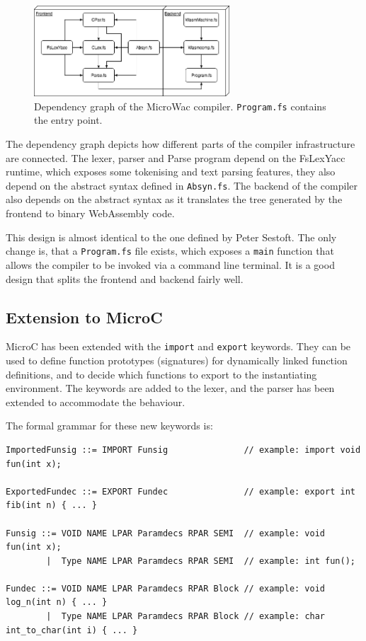 \documentclass[a4paper]{article}
\begin{document}
\begin{figure}[H]
	\includegraphics[width=0.65\textwidth]{DependencyGraph}
	\centering
	\caption{Dependency graph of the MicroWac compiler. \texttt{Program.fs} contains the entry point.}
\end{figure}

The dependency graph depicts how different parts of the compiler infrastructure are connected. The lexer, parser and Parse program depend on the FsLexYacc runtime, which exposes some tokenising and text parsing features, they also depend on the abstract syntax defined in \texttt{Absyn.fs}. The backend of the compiler also depends on the abstract syntax as it translates the tree generated by the frontend to binary WebAssembly code.

This design is almost identical to the one defined by Peter Sestoft. The only change is, that a \texttt{Program.fs} file exists, which exposes a \texttt{main} function that allows the compiler to be invoked via a command line terminal. It is a good design that splits the frontend and backend fairly well.

\subsection{Extension to MicroC}
\label{sec:technical:extension}
MicroC has been extended with the \texttt{import} and \texttt{export} keywords. They can be used to define function prototypes (signatures) for dynamically linked function definitions, and to decide which functions to export to the instantiating environment. The keywords are added to the lexer, and the parser has been extended to accommodate the behaviour.

The formal grammar for these new keywords is:
\begin{verbatim}
ImportedFunsig ::= IMPORT Funsig               // example: import void fun(int x);

ExportedFundec ::= EXPORT Fundec               // example: export int fib(int n) { ... }

Funsig ::= VOID NAME LPAR Paramdecs RPAR SEMI  // example: void fun(int x);
        |  Type NAME LPAR Paramdecs RPAR SEMI  // example: int fun();
        
Fundec ::= VOID NAME LPAR Paramdecs RPAR Block // example: void log_n(int n) { ... }
        |  Type NAME LPAR Paramdecs RPAR Block // example: char int_to_char(int i) { ... }
\end{verbatim}
\end{document}
